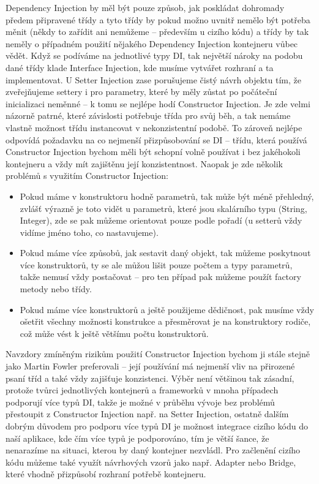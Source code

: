 \documentclass[a4paper,conference]{IEEEtran}
\begin{document}
Dependency Injection by měl být pouze způsob, jak poskládat dohromady předem připravené třídy a tyto třídy by pokud možno uvnitř nemělo být potřeba měnit (někdy to zařídit ani nemůžeme – především u cizího kódu) a třídy by tak neměly o případném použití nějakého Dependency Injection kontejneru vůbec vědět. Když se podíváme na jednotlivé typy DI, tak největší nároky na podobu dané třídy klade Interface Injection, kde musíme vytvářet rozhraní a ta implementovat. U Setter Injection zase porušujeme čistý návrh objektu tím, že zveřejňujeme settery i pro parametry, které by měly zůstat po počáteční inicializaci neměnné – k tomu se nejlépe hodí Constructor Injection. Je zde velmi názorně patrné, které závislosti potřebuje třída pro svůj běh, a tak nemáme vlastně možnost třídu instancovat v nekonzistentní podobě. To zároveň nejlépe odpovídá požadavku na co nejmenší přizpůsobování se DI – třídu, která používá Constructor Injection bychom měli být schopní volně používat i bez jakéhokoli kontejneru a vždy mít zajištěnu její konzistentnost.
Naopak je zde několik problémů s využitím Constructor Injection:
\begin{itemize}
\item Pokud máme v konstruktoru hodně parametrů, tak může být méně přehledný, zvlášť výrazně je toto vidět u parametrů, které jsou skalárního typu (String, Integer), zde se pak můžeme orientovat pouze podle pořadí (u setterů vždy vidíme jméno toho, co nastavujeme).
\item Pokud máme více způsobů, jak sestavit daný objekt, tak můžeme poskytnout více konstruktorů, ty se ale můžou lišit pouze počtem a typy parametrů, takže nemusí vždy postačovat – pro ten případ pak můžeme použít factory metody nebo třídy.
\item Pokud máme více konstruktorů a ještě použijeme dědičnost, pak musíme vždy ošetřit všechny možnosti konstrukce a přesměrovat je na konstruktory rodiče, což může vést k ještě většímu počtu konstruktorů.
\end{itemize}
Navzdory zmíněným rizikům použití Constructor Injection bychom ji stále stejně jako Martin Fowler preferovali – její používání má nejmenší vliv na přirozené psaní tříd a také vždy zajišťuje konzistenci. Výběr není většinou tak zásadní, protože tvůrci jednotlivých kontejnerů a frameworků v mnoha případech podporují více typů DI, takže je možné v průběhu vývoje bez problémů přestoupit z Constructor Injection např. na Setter Injection, ostatně dalším dobrým důvodem pro podporu více typů DI je možnost integrace cizího kódu do naší aplikace, kde čím více typů je podporováno, tím je větší šance, že nenarazíme na situaci, kterou by daný kontejner nezvládl. Pro začlenění cizího kódu můžeme také využít návrhových vzorů jako např. Adapter nebo Bridge, které vhodně přizpůsobí rozhraní potřebě kontejneru.
\end{document}

